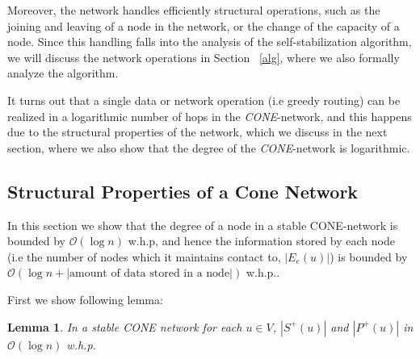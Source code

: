 \documentclass[11pt]{article}
\newtheorem{lemma}[theorem]{Lemma}
\begin{document}
Moreover, the network handles efficiently structural operations, such as the joining and leaving of a node in the network, or the change of the capacity of
a node. Since this handling falls into the analysis of the self-stabilization algorithm, we will discuss the network operations in Section ~\ref{alg}, where we also formally analyze the algorithm.

It turns out that a single data or network operation (i.e greedy routing) can be realized in a logarithmic number of hops in the \emph{CONE}-network, and this happens due  to
the structural properties of the network, which we discuss in the next section, where we also show that the degree of the \emph{CONE}-network is logarithmic.

\subsection{Structural Properties of a Cone Network}

In this section we show that the degree of a node in a stable CONE-network is bounded by $\mathcal O(\log n)$ w.h.p, and hence the information stored by each node (i.e the number of nodes which it maintains contact to, $|E_e(u)|$) is bounded by $\mathcal O(\log n + |\text{amount of data stored in a node}|)$ w.h.p..

First we show following lemma:

\begin{lemma}\label{log}
In a stable CONE network for each $u\in V$, $| S^+(u)|$ and $| P^+(u)|$ in $\mathcal O(\log n)$ w.h.p.
\end{lemma}
\end{document}
